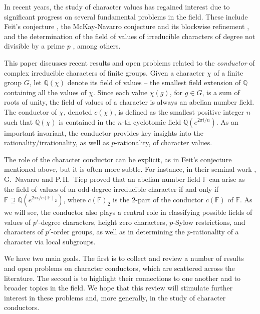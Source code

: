 \documentclass[12pt]{amsart}
\theoremstyle{definition}
\numberwithin{equation}{section}
\newcommand{\QQ}{{\mathbb Q}}
\newcommand{\FF}{{\mathbb F}}
\begin{document}
In recent years, the study of character values has regained interest
due to significant progress on several fundamental problems in the
field. These include Feit's conjecture \cite{Feit80}, the
McKay-Navarro conjecture and its blockwise refinement
\cite{Navarro04}, and the determination of the field of values of
irreducible characters of degree not divisible by a prime $p$
\cite{Navarro-Tiep21}, among others.

This paper discusses recent results and open problems related to the
\emph{conductor} of complex irreducible characters of finite groups.
Given a character $\chi$ of a finite group $G$, let $\QQ(\chi)$
denote its field of values -- the smallest field extension of $\QQ$
containing all the values of $\chi$. Since each value $\chi(g)$, for
$g\in G$, is a sum of roots of unity, the field of values of a
character is always an abelian number field. The conductor of
$\chi$, denoted $c(\chi)$, is defined as the smallest positive
integer $n$ such that $\QQ(\chi)$ is contained in the $n$-th
cyclotomic field $\QQ(e^{2\pi i/n})$. As an important invariant, the
conductor provides key insights into the rationality/irrationality,
as well as $p$-rationality, of character values.

The role of the character conductor can be explicit, as in Feit's
conjecture mentioned above, but it is often more subtle. For
instance, in their seminal work \cite{Navarro-Tiep21}, G.~Navarro
and P.\,H.~Tiep proved that an abelian number field $\FF$ can arise
as the field of values of an odd-degree irreducible character if and
only if $\FF\supseteq \QQ(e^{2\pi i/{c(\FF)_2}})$, where $c(\FF)_2$
is the $2$-part of the conductor $c(\FF)$ of $\FF$. As we will see,
the conductor also plays a central role in classifying possible
fields of values of $p'$-degree characters, height zero characters,
$p$-Sylow restrictions, and characters of $p'$-order groups, as well
as in determining the $p$-rationality of a character via local
subgroups.

We have two main goals. The first is to collect and review a number
of results and open problems on character conductors, which are
scattered across the literature. The second is to highlight their
connections to one another and to broader topics in the field. We
hope that this review will stimulate further interest in these
problems and, more generally, in the study of character conductors.


\end{document}
